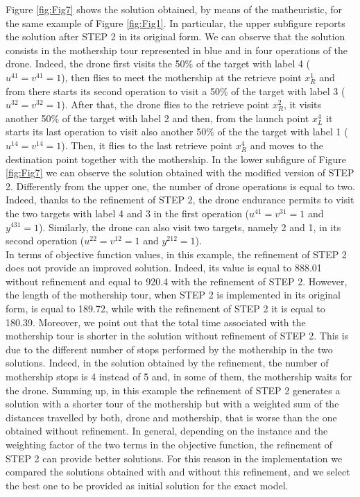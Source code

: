 Figure \ref{fig:Fig7} shows the solution obtained, by means of the matheuristic, for the same example of Figure \ref{fig:Fig1}. In particular, the upper subfigure reports the solution after STEP 2 in its original form. We can observe that the solution consists in the mothership tour represented in blue and in four operations of the drone. Indeed, the drone first visits the 50\% of the target with label 4 ($u^{41}=v^{41}=1$), then flies to meet the mothership at the retrieve point $x_R^1$ and from there starts its second operation to visit a 50\% of the target with label 3 ($u^{32}=v^{32}=1$). After that, the drone flies to the retrieve point $x_R^2$, it visits another 50\% of the target with label 2 and then, from the launch point $x_L^4$ it starts its last operation to visit also another 50\% of the the target with label 1 ($u^{14}=v^{14}=1$). Then, it flies to the last retrieve point $x_R^4$ and moves to the destination point together with the mothership.
In the lower subfigure of Figure \ref{fig:Fig7} we can observe the solution obtained with the modified version of STEP 2. Differently from the upper one, the number of drone operations is equal to two. Indeed, thanks to the refinement of STEP 2, the drone endurance permits to visit the two targets with label 4 and 3 in the first operation  ($u^{41}=v^{31}=1$ and $y^{431}=1$). Similarly, the drone can also visit two targets, namely 2 and 1, in its second operation ($u^{22}=v^{12}=1$ and $y^{212}=1$).\\ 
In terms of objective function values, in this example, the refinement of STEP 2 does not provide an improved solution. Indeed, its value is equal to 888.01 without refinement and equal to 920.4 with the refinement of STEP 2. 
However, the length of the mothership tour, when STEP 2 is implemented in its original form, is equal to 189.72, while with the refinement of STEP 2 it is equal to 180.39. 
Moreover, we point out that the total time associated with the mothership tour is shorter in the solution without refinement of STEP 2. This is due to the different number of stops performed by the mothership in the two solutions. Indeed, in the solution obtained by the refinement, the number of mothership stops is 4 instead of 5 and, in some of them, the mothership waits for the drone. Summing up, in this example the refinement of STEP 2 generates a solution with a shorter tour of the mothership but with a weighted sum of the distances travelled by both, drone and mothership, that is worse than the one obtained without refinement. In general, depending on the instance and the weighting factor of the two terms in the objective function, the refinement of STEP 2 can provide better solutions. For this reason in the implementation we compared the solutions obtained with and without this refinement, and we select the best one to be provided as initial solution for the exact model.


